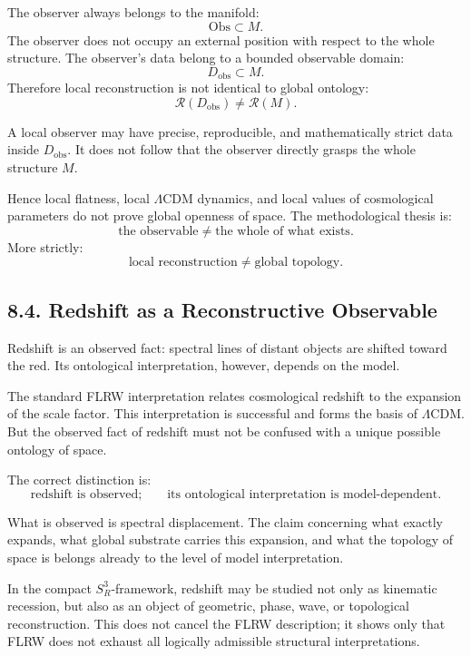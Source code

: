 \documentclass[12pt,a4paper]{article}
\theoremstyle{definition}
\begin{document}
The observer always belongs to the manifold:
\[
\mathrm{Obs}\subset M.
\]
The observer does not occupy an external position with respect to the whole structure. The observer's data belong to a bounded observable domain:
\[
D_{\mathrm{obs}}\subset M.
\]
Therefore local reconstruction is not identical to global ontology:
\[
\mathcal R(D_{\mathrm{obs}})\neq \mathcal R(M).
\]

A local observer may have precise, reproducible, and mathematically strict data inside \(D_{\mathrm{obs}}\). It does not follow that the observer directly grasps the whole structure \(M\).

Hence local flatness, local \(\Lambda\)CDM dynamics, and local values of cosmological parameters do not prove global openness of space. The methodological thesis is:
\[
\text{the observable}\neq \text{the whole of what exists}.
\]
More strictly:
\[
\text{local reconstruction}\neq \text{global topology}.
\]

\subsection*{8.4. Redshift as a Reconstructive Observable}

Redshift is an observed fact: spectral lines of distant objects are shifted toward the red. Its ontological interpretation, however, depends on the model.

The standard FLRW interpretation relates cosmological redshift to the expansion of the scale factor. This interpretation is successful and forms the basis of \(\Lambda\)CDM. But the observed fact of redshift must not be confused with a unique possible ontology of space.

The correct distinction is:
\[
\text{redshift is observed;}
\qquad
\text{its ontological interpretation is model-dependent.}
\]

What is observed is spectral displacement. The claim concerning what exactly expands, what global substrate carries this expansion, and what the topology of space is belongs already to the level of model interpretation.

In the compact \(S^3_R\)-framework, redshift may be studied not only as kinematic recession, but also as an object of geometric, phase, wave, or topological reconstruction. This does not cancel the FLRW description; it shows only that FLRW does not exhaust all logically admissible structural interpretations.
\end{document}
